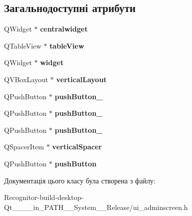 \subsection*{Загальнодоступні атрибути}
\begin{DoxyCompactItemize}
\item 
\hypertarget{classUi__AdminScreen_ab66473b046e698cd8090c3fa0fa404f8}{Q\-Widget $\ast$ {\bfseries centralwidget}}\label{classUi__AdminScreen_ab66473b046e698cd8090c3fa0fa404f8}

\item 
\hypertarget{classUi__AdminScreen_ad315d893b5b5b0f1ddc07e3015826af9}{Q\-Table\-View $\ast$ {\bfseries table\-View}}\label{classUi__AdminScreen_ad315d893b5b5b0f1ddc07e3015826af9}

\item 
\hypertarget{classUi__AdminScreen_a1212e3eec1524e8796bc5477a696c920}{Q\-Widget $\ast$ {\bfseries widget}}\label{classUi__AdminScreen_a1212e3eec1524e8796bc5477a696c920}

\item 
\hypertarget{classUi__AdminScreen_a35e2f0ce11c816c94537e0cc0e82802a}{Q\-V\-Box\-Layout $\ast$ {\bfseries vertical\-Layout}}\label{classUi__AdminScreen_a35e2f0ce11c816c94537e0cc0e82802a}

\item 
\hypertarget{classUi__AdminScreen_a68c1187df54f74e05838aa4504ffedf5}{Q\-Push\-Button $\ast$ {\bfseries push\-Button\-\_}}\label{classUi__AdminScreen_a68c1187df54f74e05838aa4504ffedf5}

\item 
\hypertarget{classUi__AdminScreen_a676124dea795926160a979a358e5d675}{Q\-Push\-Button $\ast$ {\bfseries push\-Button\-\_}}\label{classUi__AdminScreen_a676124dea795926160a979a358e5d675}

\item 
\hypertarget{classUi__AdminScreen_a6ff6389f23502818e00c3e74b04de510}{Q\-Push\-Button $\ast$ {\bfseries push\-Button\-\_}}\label{classUi__AdminScreen_a6ff6389f23502818e00c3e74b04de510}

\item 
\hypertarget{classUi__AdminScreen_abaf9409db469e4b7edcb7701b3f4b7f4}{Q\-Spacer\-Item $\ast$ {\bfseries vertical\-Spacer}}\label{classUi__AdminScreen_abaf9409db469e4b7edcb7701b3f4b7f4}

\item 
\hypertarget{classUi__AdminScreen_a5e92b9e0a9297641f89d393e1e31ba3f}{Q\-Push\-Button $\ast$ {\bfseries push\-Button}}\label{classUi__AdminScreen_a5e92b9e0a9297641f89d393e1e31ba3f}

\end{DoxyCompactItemize}


Документація цього класу була створена з файлу\-:\begin{DoxyCompactItemize}
\item 
Recognitor-\/build-\/desktop-\/\-Qt\-\_\-\_\-\_\-\_\-in\-\_\-\-P\-A\-T\-H\-\_\-\-\_\-\-System\-\_\-\-\_\-\-Release/ui\-\_\-adminscreen.\-h\end{DoxyCompactItemize}
